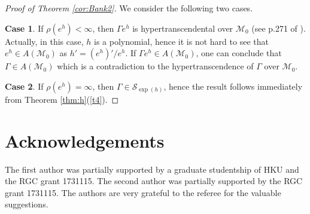 \documentclass[reqno,12pt]{amsart}
\begin{document}
\begin{proof}[Proof of Theorem \ref{cor:Bank2}]
 We consider the following two cases.

\noindent\textbf{Case 1}. If $\rho(e^h)<\infty$, then $\Gamma e^h$ is hypertranscendental over $\mathcal{M}_0$ (see p.271 of \cite{Bank80}). Actually, in this case, $h$ is a polynomial, hence it is not hard to see that $e^h\in A(\mathcal{M}_0)$ as $h'=(e^h)'/e^h$. If $\Gamma e^h\in A(\mathcal{M}_0)$, one can conclude that $\Gamma\in A(\mathcal{M}_0)$ which is a contradiction to the hypertranscendence of $\Gamma$ over $\mathcal{M}_0$.

\noindent\textbf{Case 2}. If $\rho(e^h)=\infty$, then $\Gamma\in\mathcal{S}_{\exp(h)}$, hence the result follows immediately from Theorem \ref{thm:h}(\ref{t4}).
\end{proof}

\section*{Acknowledgements} The first author was partially supported by a graduate studentship of HKU and the RGC grant 1731115. The second author was partially supported by the RGC grant 1731115. The authors are very grateful to the referee for the valuable suggestions.




% 
%   
  





\end{document}
